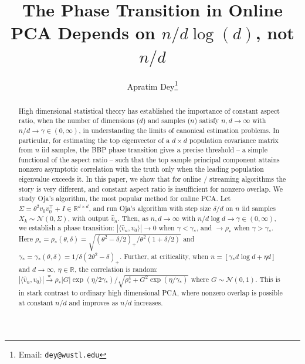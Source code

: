 \documentclass[12pt]{article}
\title{The Phase Transition in Online PCA Depends on $n/d\log(d)$, not $n/d$}
\author{
    Apratim Dey\thanks{Email: \texttt{dey@wustl.edu}}
}
\affil{\textit{Washington University in St. Louis}}
\begin{document}
\maketitle

\begin{abstract}
High dimensional statistical theory has established the importance of constant aspect ratio, when the number of dimensions ($d$) and samples ($n$) satisfy $n,d\to\infty$ with $n/d\to \gamma\in(0,\infty)$, in understanding the limits of canonical estimation problems. In particular, for estimating the top eigenvector of a $d\times d$ population covariance matrix from $n$ iid samples, the BBP phase transition gives a precise threshold -- a simple functional of the aspect ratio -- such that the top sample principal component attains nonzero asymptotic correlation with the truth only when the leading population eigenvalue exceeds it. In this paper, we show that for online / streaming algorithms the story is very different, and constant aspect ratio is insufficient for nonzero overlap. We study Oja's algorithm, the most popular method for online PCA. Let $\Sigma=\theta^2 v_0v_0^\top+I\in\mathbb{R}^{d\times d}$, and run Oja's algorithm with step size $\delta/d$ on $n$ iid samples $X_k\sim\mathcal{N}(0,\Sigma)$, with output $\hat v_n$. Then, as $n,d\to\infty$ with $n/d\log d\to\gamma\in(0,\infty)$, we establish a phase transition: $|\langle\hat v_n,v_0\rangle|\to 0$ when $\gamma<\gamma_*$, and $\to\rho_*$ when $\gamma>\gamma_*$. Here $\rho_*=\rho_*(\theta,\delta)=\sqrt{(\theta^2-\delta/2)_+/\theta^2(1+\delta/2)}$ and $\gamma_*=\gamma_*(\theta,\delta)=1/\delta(2\theta^2-\delta)_+$. Further, at criticality, when $n=[\gamma_*d\log d+\eta d]$ and $d\to\infty$, $\eta\in\mathbb{R}$, the correlation is random: $|\langle\hat v_n,v_0\rangle|\stackrel{w}{\to}\rho_*|G|\exp(\eta/2\gamma_*)/\sqrt{\rho_*^4+G^2\exp(\eta/\gamma_*)}$ where $G\sim\mathcal{N}(0,1)$. This is in stark contrast to ordinary high dimensional PCA, where nonzero overlap is possible at constant $n/d$ and improves as $n/d$ increases.



\end{abstract}
\end{document}
